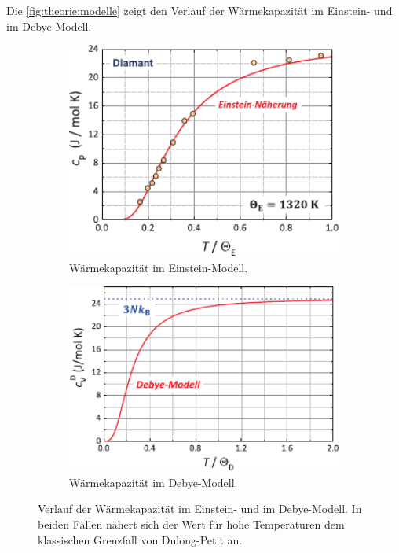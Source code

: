     Die \autoref{fig:theorie:modelle} zeigt den Verlauf der Wärmekapazität im Einstein- und im Debye-Modell.
    \begin{figure}
        \centering
        \begin{subfigure}{0.48\textwidth}
            \centering
            \includegraphics[width=1\textwidth]{content/img/Gross_Marx/6_5.pdf}
            \caption{Wärmekapazität im Einstein-Modell.}
            \label{fig:theorie:einsteinmodell}
        \end{subfigure}
        \hfill
        \begin{subfigure}{0.48\textwidth}
            \centering
            \includegraphics[width=1\textwidth]{content/img/Gross_Marx/6_7.pdf}
            \caption{Wärmekapazität im Debye-Modell.}
            \label{fig:theorie:debyemodell}
        \end{subfigure}
        \caption{Verlauf der Wärmekapazität im Einstein- und im Debye-Modell.
        In beiden Fällen nähert sich der Wert für hohe Temperaturen dem klassischen Grenzfall von Dulong-Petit an. \cite{grossmarx}}
        \label{fig:theorie:modelle}
    \end{figure}
